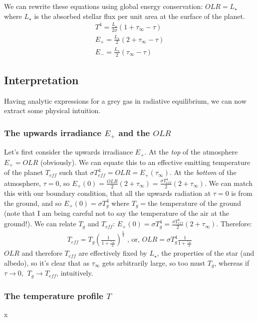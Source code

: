 We can rewrite these equations using global energy conservation: $OLR=L_\star$ where $L_\star$ is the absorbed stellar flux per unit area at the surface of the planet.
\begin{align}
    {T^4=\frac{L_\star}{2\sigma}(1+\tau_\infty-\tau)}\\
    {E_+=\frac{L_\star}{2}(2+\tau_\infty-\tau)}\\
    {E_-=\frac{L_\star}{2}(\tau_\infty-\tau)}
\end{align}

\subsection{Interpretation}

Having analytic expressions for a grey gas in radiative equilibrium, we can now extract some physical intuition. 

\subsubsection{The upwards irradiance $E_+$ and the $OLR$}

Let's first consider the upwards irradiance $E_+$. At the \textit{top} of the atmosphere $E_+=OLR$ (obviously). We can equate this to an effective emitting temperature of the planet $T_{eff}$ such that $\sigma T_{eff}^4=OLR=E_+(\tau_\infty)$. At the \textit{bottom} of the atmosphere, $\tau=0$, so $E_+(0)=\frac{OLR}{2}(2+\tau_\infty)=\frac{\sigma T_{eff}^4}{2}(2+\tau_\infty)$. We can match this with our boundary condition, that all the upwards radiation at $\tau=0$ is from the ground, and so $E_+(0)=\sigma T_g^4$ where $T_g=$the temperature of the ground (note that I am being careful not to say the temperature of the air at the ground!). We can relate $T_g$ and $T_{eff}$: $E_+(0)=\sigma T_{g}^4=\frac{\sigma T_{eff}^4}{2}(2+\tau_\infty)$. Therefore:
\begin{align*}
    T_{eff}=T_{g}\left(\frac{1}{1+\frac{\tau_\infty}{2}}\right)^\frac{1}{4} \,\,\text{, or,}\,\,
    OLR=\sigma T_g^4\frac{1}{1+\frac{\tau_\infty}{2}}
\end{align*}
$OLR$ and therefore $T_{eff}$ are effectively fixed by $L_\star$, the properties of the star (and albedo), so it's clear that as $\tau_\infty$ gets arbitrarily large, so too must $T_g$, whereas if $\tau\to0$, $\ T_g\to T_{eff}$, intuitively.

\subsubsection{The temperature profile $T$}x

